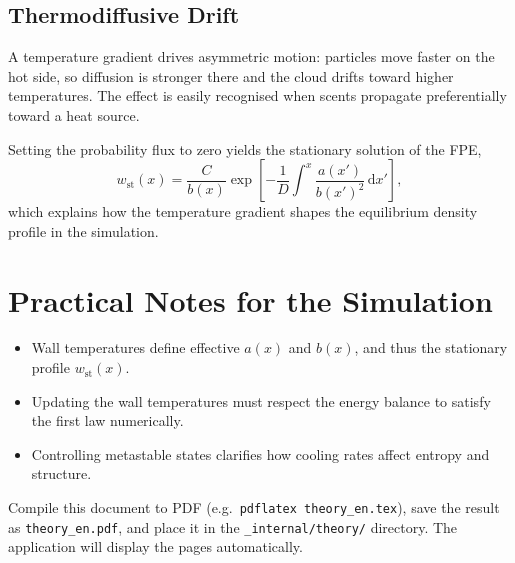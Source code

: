\documentclass[12pt,a4paper]{article}
\begin{document}
\subsection{Thermodiffusive Drift}
A temperature gradient drives asymmetric motion: particles move faster on the hot side, so diffusion is stronger there and the cloud drifts toward higher temperatures. The effect is easily recognised when scents propagate preferentially toward a heat source.

Setting the probability flux to zero yields the stationary solution of the FPE,
\begin{equation}
    w_{\mathrm{st}}(x) = \frac{C}{b(x)} \exp\!\left[ -\frac{1}{D} \int^x \frac{a(x')}{b(x')^2}\, \mathrm{d}x' \right],
\end{equation}
which explains how the temperature gradient shapes the equilibrium density profile in the simulation.

\section{Practical Notes for the Simulation}
\begin{itemize}
    \item Wall temperatures define effective $a(x)$ and $b(x)$, and thus the stationary profile $w_{\mathrm{st}}(x)$.
    \item Updating the wall temperatures must respect the energy balance to satisfy the first law numerically.
    \item Controlling metastable states clarifies how cooling rates affect entropy and structure.
\end{itemize}

\vspace{1em}
\noindent%
Compile this document to PDF (e.g.\ \texttt{pdflatex theory\_en.tex}), save the result as \texttt{theory\_en.pdf}, and place it in the \texttt{\_internal/theory/} directory. The application will display the pages automatically.
\end{document}
